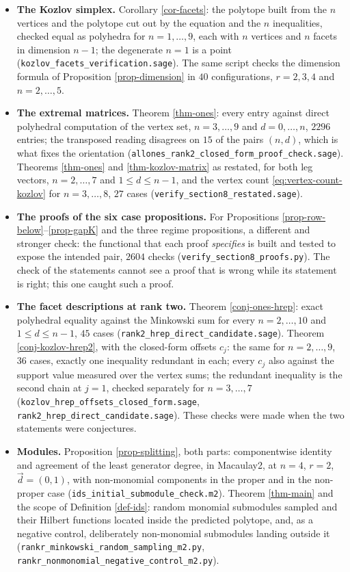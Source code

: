 \documentclass[11pt, a4paper, abstract=yes]{scrartcl}
\theoremstyle{definition}
\theoremstyle{remark}
\theoremstyle{plain}
\begin{document}
\begingroup\sloppy
\begin{itemize}
\item \textbf{The Kozlov simplex.} Corollary \ref{cor-facets}: the polytope built from the \(n\) vertices and the
polytope cut out by the equation and the \(n\) inequalities, checked equal as polyhedra for
\(n=1,\dots,9\), each with \(n\) vertices and \(n\) facets in dimension \(n-1\); the degenerate
\(n=1\) is a point (\texttt{kozlov\_facets\_verification.sage}). The same script checks the dimension
formula of Proposition \ref{prop-dimension} in \(40\) configurations, \(r=2,3,4\) and \(n=2,\dots,5\).
\item \textbf{The extremal matrices.} Theorem \ref{thm-ones}: every entry against direct polyhedral computation
of the vertex set, \(n=3,\dots,9\) and \(d=0,\dots,n\), \(2296\) entries; the transposed reading
disagrees on \(15\) of the pairs \((n,d)\), which is what fixes the orientation
(\texttt{allones\_rank2\_closed\_form\_proof\_check.sage}). Theorems \ref{thm-ones} and \ref{thm-kozlov-matrix}
as restated, for both leg vectors, \(n=2,\dots,7\) and \(1\le d\le n-1\), and the vertex count
\eqref{eq:vertex-count-kozlov} for \(n=3,\dots,8\), \(27\) cases
(\texttt{verify\_section8\_restated.sage}).
\item \textbf{The proofs of the six case propositions.} For Propositions \ref{prop-row-below}--\ref{prop-gapK} and
the three regime propositions, a different and stronger check: the functional that each proof
\emph{specifies} is built and tested to expose the intended pair, \(2604\) checks
(\texttt{verify\_section8\_proofs.py}). The check of the statements cannot see a proof that is wrong
while its statement is right; this one caught such a proof.
\item \textbf{The facet descriptions at rank two.} Theorem \ref{conj-ones-hrep}: exact polyhedral equality against
the Minkowski sum for every \(n=2,\dots,10\) and \(1\le d\le n-1\), \(45\) cases
(\texttt{rank2\_hrep\_direct\_candidate.sage}). Theorem \ref{conj-kozlov-hrep2}, with the closed-form offsets
\(c_j\): the same for \(n=2,\dots,9\), \(36\) cases, exactly one inequality redundant in each;
every \(c_j\) also against the support value measured over the vertex sums; the redundant
inequality is the second chain at \(j=1\), checked separately for \(n=3,\dots,7\)
(\texttt{kozlov\_hrep\_offsets\_closed\_form.sage}, \texttt{rank2\_hrep\_direct\_candidate.sage}). These checks were
made when the two statements were conjectures.
\item \textbf{Modules.} Proposition \ref{prop-splitting}, both parts: componentwise identity and agreement of the
least generator degree, in Macaulay2, at \(n=4\), \(r=2\), \(\vec d=(0,1)\), with non-monomial
components in the proper and in the non-proper case (\texttt{ids\_initial\_submodule\_check.m2}).
Theorem \ref{thm-main} and the scope of Definition \ref{def-ids}: random monomial submodules sampled
and their Hilbert functions located inside the predicted polytope, and, as a negative control,
deliberately non-monomial submodules landing outside it
(\texttt{rankr\_minkowski\_random\_sampling\_m2.py}, \texttt{rankr\_nonmonomial\_negative\_control\_m2.py}).
\end{itemize}
\endgroup
\end{document}
